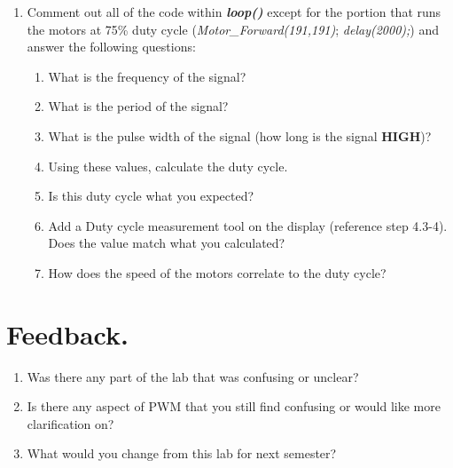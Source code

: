 \documentclass{handout}
\begin{document}
\begin{enumerate}
	\newpage
\clearpage
\pagebreak


\item Comment out all of the code within \textbf{\textit{loop()}} except for the portion that runs the motors at 75\% duty cycle (\textit{Motor\_Forward(191,191)}; \textit{delay(2000);}) and answer the following questions:
\begin{enumerate}
	\item What is the frequency of the signal? 
	\item What is the period of the signal? \soln{.3in}{}
	\item What is the pulse width of the signal (how long is the signal \textbf{HIGH})? \soln{.3in}{}
	\item Using these values, calculate the duty cycle. \soln{.3in}{}
	\item Is this duty cycle what you expected? \soln{.3in}{}
	\item Add a Duty cycle measurement tool on the display (reference step 4.3-4). Does the value match what you calculated?\soln{.3in}{}
	\item How does the speed of the motors correlate to the duty cycle? \soln{.3in}{}
	
\end{enumerate}
	\end{enumerate}
\section{Feedback.}
\begin{enumerate}
	\item Was there any part of the lab that was confusing or unclear? \soln{.3in}{}
	\item Is there any aspect of PWM that you still find confusing or would like more clarification on? \soln{.3in}{}
	\item What would you change from this lab for next semester? \soln{.3in}{}
\end{enumerate}
	
\end{document}
